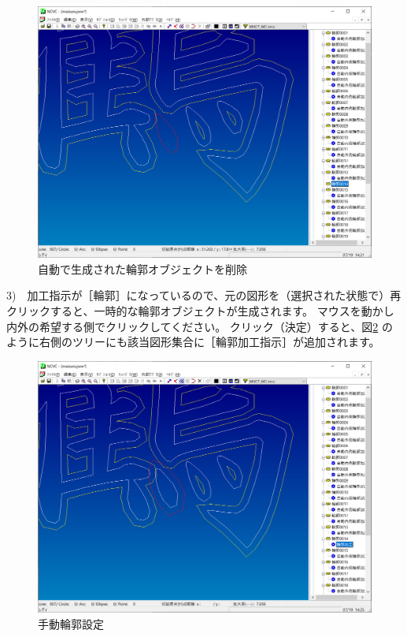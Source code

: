 \begin{figure}[H]
\centering
\includegraphics[scale=0.55]{No3/fig/inout2.png}
\caption{自動で生成された輪郭オブジェクトを削除}
\label{fig:inout2.png}
\end{figure}

3)　加工指示が［輪郭］になっているので、元の図形を（選択された状態で）再クリックすると、一時的な輪郭オブジェクトが生成されます。
マウスを動かし内外の希望する側でクリックしてください。
クリック（決定）すると、図\ref{fig:inout3.png} のように右側のツリーにも該当図形集合に［輪郭加工指示］が追加されます。

\begin{figure}[H]
\centering
\includegraphics[scale=0.55]{No3/fig/inout3.png}
\caption{手動輪郭設定}
\label{fig:inout3.png}
\end{figure}

